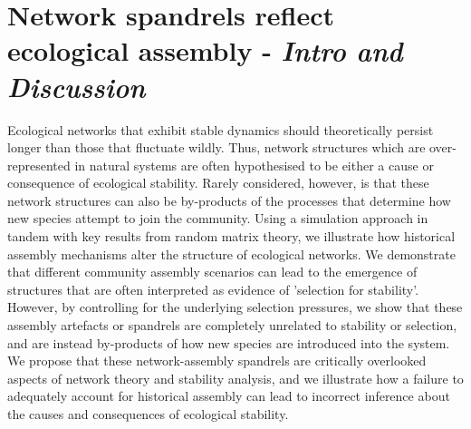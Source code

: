 \section*{Network spandrels reflect ecological assembly \citep{Maynard2018} - \textit{Intro  and Discussion}}

Ecological networks that exhibit stable dynamics should theoretically persist longer than those that fluctuate wildly. Thus, network structures which are over-represented in natural systems are often hypothesised to be either a cause or consequence of ecological stability. Rarely considered, however, is that these network structures can also be by-products of the processes that determine how new species attempt to join the community. Using a simulation approach in tandem with key results from random matrix theory, we illustrate how historical assembly mechanisms alter the structure of ecological networks. We demonstrate that different community assembly scenarios can lead to the emergence of structures that are often interpreted as evidence of 'selection for stability'. However, by controlling for the underlying selection pressures, we show that these assembly artefacts or spandrels are completely unrelated to stability or selection, and are instead by-products of how new species are introduced into the system. We propose that these network-assembly spandrels are critically overlooked aspects of network theory and stability analysis, and we illustrate how a failure to adequately account for historical assembly can lead to incorrect inference about the causes and consequences of ecological stability.

